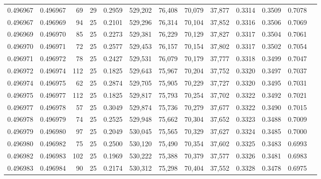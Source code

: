 \begin{tabular}{rrrrrrrrrrrrr}
0.496967 & 0.496967 &    69 &  29 &                                     0.2959 & 529,202 &  76,408 &  70,079 &  37,877 & 0.3314 & 0.3509 & 0.7078 \\
0.496967 & 0.496969 &    94 &  25 &                                     0.2101 & 529,296 &  76,314 &  70,104 &  37,852 & 0.3316 & 0.3506 & 0.7069 \\
0.496969 & 0.496970 &    85 &  25 &                                     0.2273 & 529,381 &  76,229 &  70,129 &  37,827 & 0.3317 & 0.3504 & 0.7061 \\
0.496970 & 0.496971 &    72 &  25 &                                     0.2577 & 529,453 &  76,157 &  70,154 &  37,802 & 0.3317 & 0.3502 & 0.7054 \\
0.496971 & 0.496972 &    78 &  25 &                                     0.2427 & 529,531 &  76,079 &  70,179 &  37,777 & 0.3318 & 0.3499 & 0.7047 \\
0.496972 & 0.496974 &   112 &  25 &                                     0.1825 & 529,643 &  75,967 &  70,204 &  37,752 & 0.3320 & 0.3497 & 0.7037 \\
0.496974 & 0.496975 &    62 &  25 &                                     0.2874 & 529,705 &  75,905 &  70,229 &  37,727 & 0.3320 & 0.3495 & 0.7031 \\
0.496975 & 0.496977 &   112 &  25 &                                     0.1825 & 529,817 &  75,793 &  70,254 &  37,702 & 0.3322 & 0.3492 & 0.7021 \\
0.496977 & 0.496978 &    57 &  25 &                                     0.3049 & 529,874 &  75,736 &  70,279 &  37,677 & 0.3322 & 0.3490 & 0.7015 \\
0.496978 & 0.496979 &    74 &  25 &                                     0.2525 & 529,948 &  75,662 &  70,304 &  37,652 & 0.3323 & 0.3488 & 0.7009 \\
0.496979 & 0.496980 &    97 &  25 &                                     0.2049 & 530,045 &  75,565 &  70,329 &  37,627 & 0.3324 & 0.3485 & 0.7000 \\
0.496980 & 0.496982 &    75 &  25 &                                     0.2500 & 530,120 &  75,490 &  70,354 &  37,602 & 0.3325 & 0.3483 & 0.6993 \\
0.496982 & 0.496983 &   102 &  25 &                                     0.1969 & 530,222 &  75,388 &  70,379 &  37,577 & 0.3326 & 0.3481 & 0.6983 \\
0.496983 & 0.496984 &    90 &  25 &                                     0.2174 & 530,312 &  75,298 &  70,404 &  37,552 & 0.3328 & 0.3478 & 0.6975 \\

\end{tabular}
